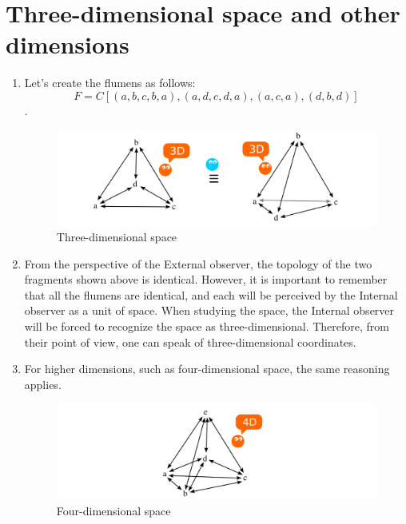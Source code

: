 \documentclass[final]{article}
\begin{document}
    \section{Three-dimensional space and other dimensions}
        \begin{enumerate}
            \item Let's create the flumens as follows: \[ F =
            C[(a,b,c,b,a), (a,d,c,d,a), (a,c,a), (d,b,d)] \].

            \begin{figure}[H]
                \centering
                \includegraphics[width=\textwidth]{./3d-f1f2f3f4f5.png}
                \caption{Three-dimensional space}
                \label{fig:image}
            \end{figure}

            \item From the perspective of the External observer, the topology of 
            the two fragments shown above is identical. However, it is important 
            to remember that all the flumens are identical, and each will be 
            perceived by the Internal observer as a unit of space. When studying 
            the space, the Internal observer will be forced to recognize the 
            space as three-dimensional. Therefore, from their point of view, one 
            can speak of three-dimensional coordinates.

            \item For higher dimensions, such as four-dimensional space, the 
            same reasoning applies.

            \begin{figure}[H]
                \centering
                \includegraphics[width=\textwidth]{./4d.png}
                \caption{Four-dimensional space}
                \label{fig:image}
            \end{figure}

        \end{enumerate}
\end{document}
